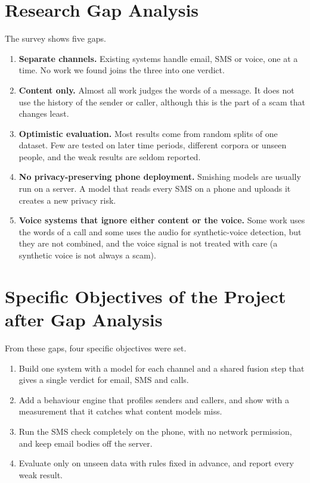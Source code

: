 {\section{Research Gap Analysis}
The survey shows five gaps.
\begin{enumerate}
\item \textbf{Separate channels.} Existing systems handle email, SMS or voice, one at a time. No work we found joins the three into one verdict.
\item \textbf{Content only.} Almost all work judges the words of a message. It does not use the history of the sender or caller, although this is the part of a scam that changes least.
\item \textbf{Optimistic evaluation.} Most results come from random splits of one dataset. Few are tested on later time periods, different corpora or unseen people, and the weak results are seldom reported.
\item \textbf{No privacy-preserving phone deployment.} Smishing models are usually run on a server. A model that reads every SMS on a phone and uploads it creates a new privacy risk.
\item \textbf{Voice systems that ignore either content or the voice.} Some work uses the words of a call and some uses the audio for synthetic-voice detection, but they are not combined, and the voice signal is not treated with care (a synthetic voice is not always a scam).
\end{enumerate}

\section{Specific Objectives of the Project after Gap Analysis}
From these gaps, four specific objectives were set.
\begin{enumerate}
\item Build one system with a model for each channel and a shared fusion step that gives a single verdict for email, SMS and calls.
\item Add a behaviour engine that profiles senders and callers, and show with a measurement that it catches what content models miss.
\item Run the SMS check completely on the phone, with no network permission, and keep email bodies off the server.
\item Evaluate only on unseen data with rules fixed in advance, and report every weak result.
\end{enumerate}

}
